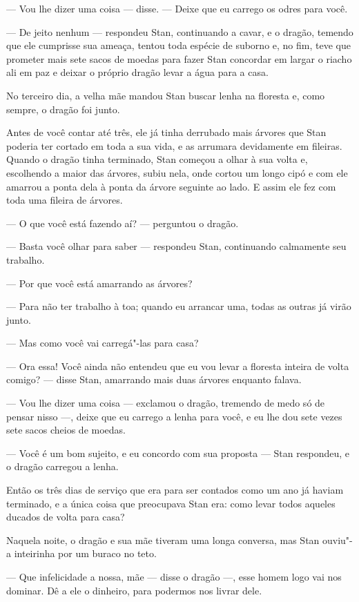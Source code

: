 --- Vou lhe dizer uma coisa --- disse. --- Deixe que eu carrego os odres
para você.

--- De jeito nenhum --- respondeu Stan, continuando a cavar, e o dragão,
temendo que ele cumprisse sua ameaça, tentou toda espécie de suborno
e, no fim, teve que prometer mais sete sacos de moedas para fazer
Stan concordar em largar o riacho ali em paz e deixar o próprio
dragão levar a água para a casa.

No terceiro dia, a velha mãe mandou Stan buscar lenha na floresta e,
como sempre, o dragão foi junto.

Antes de você contar até três, ele já tinha derrubado mais árvores que
Stan poderia ter cortado em toda a sua vida, e as arrumara
devidamente em fileiras. Quando o dragão tinha terminado, Stan
começou a olhar à sua volta e, escolhendo a maior das árvores, subiu
nela, onde cortou um longo cipó e com ele amarrou a ponta dela à
ponta da árvore seguinte ao lado. E assim ele fez com toda uma
fileira de árvores.

--- O que você está fazendo aí? --- perguntou o dragão.

--- Basta você olhar para saber --- respondeu Stan, continuando calmamente
seu trabalho.

--- Por que você está amarrando as árvores?

--- Para não ter trabalho à toa; quando eu arrancar uma, todas as outras
já virão junto. 

--- Mas como você vai carregá"-las para casa?

--- Ora essa! Você ainda não entendeu que eu vou levar a floresta
inteira de volta comigo? --- disse Stan, amarrando mais duas árvores
enquanto falava.

--- Vou lhe dizer uma coisa --- exclamou o dragão, tremendo de medo só de
pensar nisso ---, deixe que eu carrego a lenha para você, e eu lhe dou
sete vezes sete sacos cheios de moedas.

--- Você é um bom sujeito, e eu concordo com sua proposta --- Stan
respondeu, e o dragão carregou a lenha.

Então os três dias de serviço que era para ser contados como um ano já
haviam terminado, e a única coisa que preocupava Stan era: como levar
todos aqueles ducados de volta para casa?

Naquela noite, o dragão e sua mãe tiveram uma longa conversa, mas Stan
ouviu"-a inteirinha por um buraco no teto.

--- Que infelicidade a nossa, mãe --- disse o dragão ---, esse homem logo vai
nos dominar. Dê a ele o dinheiro, para podermos nos livrar dele.

